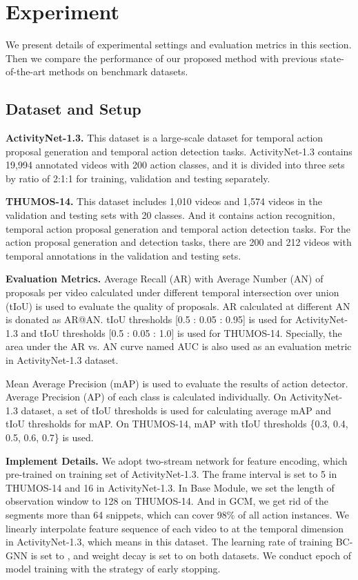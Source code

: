 \documentclass[runningheads]{llncs}
\begin{document}
\section{Experiment}
We present details of experimental settings and evaluation metrics in this section. Then we compare the performance of our proposed method with previous state-of-the-art methods on benchmark datasets.
\subsection{Dataset and Setup}

\noindent\textbf{ActivityNet-1.3.}
This dataset is a large-scale dataset for temporal action proposal generation and temporal action detection tasks. ActivityNet-1.3 contains 19,994 annotated videos with 200 action classes, and it is divided into three sets by ratio of 2:1:1 for training, validation and testing separately.

\noindent\textbf{THUMOS-14.}
This dataset includes 1,010 videos and 1,574 videos in the validation and testing sets with 20 classes. And it contains action recognition, temporal action proposal generation and temporal action detection tasks. For the action proposal generation and detection tasks, there are 200 and 212 videos with temporal annotations in the validation and testing sets.

\noindent\textbf{Evaluation Metrics.}
Average Recall (AR) with Average Number (AN) of proposals per video calculated under different temporal intersection over union (tIoU) is used to evaluate the quality of proposals. AR calculated at different AN is donated as AR@AN. tIoU thresholds [0.5 : 0.05 : 0.95] is used for ActivityNet-1.3 and tIoU thresholds [0.5 : 0.05 : 1.0] is used for THUMOS-14. Specially, the area under the AR vs. AN curve named AUC is also used as an evaluation metric in ActivityNet-1.3 dataset.

Mean Average Precision (mAP) is used to evaluate the results of action detector. Average Precision (AP) of each class is calculated individually. On ActivityNet-1.3 dataset, a set of tIoU thresholds  is used for calculating average mAP and tIoU thresholds  for mAP. On THUMOS-14, mAP with tIoU thresholds  \{0.3, 0.4, 0.5, 0.6, 0.7\} is used.

\noindent\textbf{Implement Details.}
We adopt two-stream network \cite{two-stream} for feature encoding, which pre-trained on training set of ActivityNet-1.3. The frame interval  is set to 5 in THUMOS-14 and 16 in ActivityNet-1.3.
In Base Module, we set the length of observation window   to 128 on THUMOS-14. And in GCM, we get rid of the segments more than 64 snippets, which can cover 98\% of all action instances.
We linearly interpolate feature sequence of each video to  at the temporal dimension in ActivityNet-1.3, which means  in this dataset. The learning rate of training BC-GNN is set to , and weight decay is set to  on both datasets. We conduct  epoch of model training with the strategy of early stopping.
\end{document}
